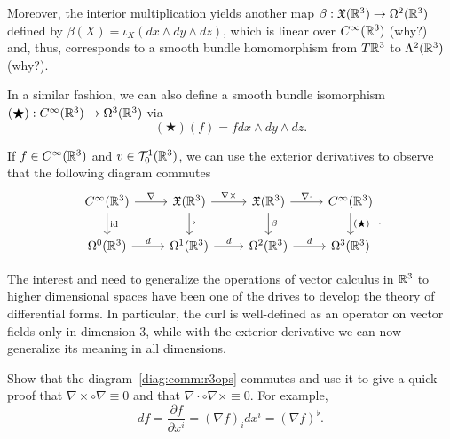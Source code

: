 \begin{example}
  Moreover, the interior multiplication yields another map $\beta: \mathfrak{X}(\mathbb{R}^3)\to\Omega^2(\mathbb{R}^3)$ defined by $\beta(X) = \iota_X (dx\wedge dy\wedge dz)$, which is linear over $C^\infty(\mathbb{R}^3)$ (why?) and, thus, corresponds to a smooth bundle homomorphism from $T\mathbb{R}^3$ to $\Lambda^2(\mathbb{R}^3)$ (why?).

  In a similar fashion, we can also define a smooth bundle isomorphism $(\bigstar): C^\infty(\mathbb{R}^3) \to \Omega^3(\mathbb{R}^3)$ via
  \begin{equation}
    (\bigstar)(f) = f dx\wedge dy\wedge dz.
  \end{equation}

  If $f\in C^\infty(\mathbb{R}^3)$ and $v\in\mathcal{T}_0^1(\mathbb{R}^3)$, we can use the exterior derivatives to observe that the following diagram commutes
  \begin{equation}\label{diag:comm:r3ops}
    \begin{tikzcd}
      C^\infty(\R^3) \arrow[d, "\id"] \arrow[r, "\nabla"] &
      \fX(\R^3) \arrow[d, "{}^\flat"] \arrow[r, "\nabla\times"] &
      \fX(\R^3) \arrow[d, "\beta"] \arrow[r, "\nabla\cdot"] &
      C^\infty(\R^3) \arrow[d, "(\bigstar)"] \\
      \Omega^0(\R^3) \arrow[r, "d"] &
      \Omega^1(\R^3) \arrow[r, "d"] &
      \Omega^2(\R^3) \arrow[r, "d"] &
      \Omega^3(\R^3)
    \end{tikzcd}.
  \end{equation}

  The interest and need to generalize the operations of vector calculus in $\mathbb{R}^3$ to higher dimensional spaces have been one of the drives to develop the theory of differential forms.
  In particular, the curl is well-defined as an operator on vector fields only in dimension $3$, while with the exterior derivative we can now generalize its meaning in all dimensions.
\end{example}

\begin{exercise}
  Show that the diagram~\eqref{diag:comm:r3ops} commutes and use it to give a quick proof that $\nabla\times\circ \nabla \equiv 0$ and that $\nabla\cdot \circ \nabla\times \equiv 0$.
  For example,
  \begin{equation}
    df = \frac{\partial f}{\partial x^i} = (\nabla f)_i dx^i = (\nabla f)^\flat.
  \end{equation}
\end{exercise}

